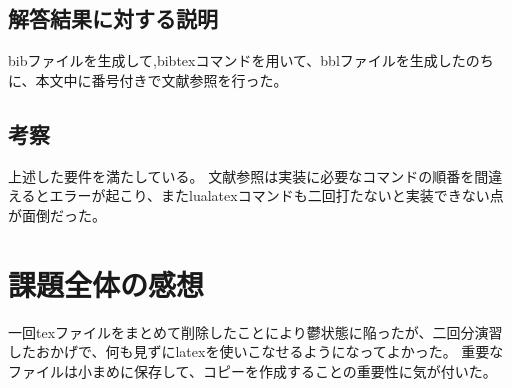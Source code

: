 \documentclass[fontsize = 14pt, paper= a4]{jlreq}
\begin{document}
\subsection{解答結果に対する説明}
bibファイルを生成して,bibtexコマンドを用いて、bblファイルを生成したのちに、本文中に番号付きで文献参照を行った。
\subsection{考察}
上述した要件を満たしている。
文献参照は実装に必要なコマンドの順番を間違えるとエラーが起こり、またlualatexコマンドも二回打たないと実装できない点が面倒だった。
\section{課題全体の感想}
一回texファイルをまとめて削除したことにより鬱状態に陥ったが、二回分演習したおかげで、何も見ずにlatexを使いこなせるようになってよかった。
重要なファイルは小まめに保存して、コピーを作成することの重要性に気が付いた。



\end{document}
